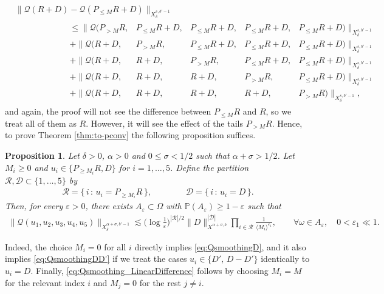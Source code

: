 \documentclass[11pt, xcolor = dvipsnames,reqno
]{amsart}
\newtheorem{prop}[thm]{Proposition}
\theoremstyle{definition}
\theoremstyle{remark}
\begin{document}
\begin{align}\label{eq:diff-ineqs}
    & \| \mathcal{Q}(R + D) - \mathcal{Q}(P_{\leq M} R + D) \|_{X^{s,b'-1}_{\delta}}  \\
    & \qquad \qquad \qquad \begin{array}{rrrrrrrr}
        \leq \big\| \mathcal{Q}( P_{> M} R,  & P_{\leq M} R + D, & P_{\leq M} R + D, & P_{\leq M} R + D, & P_{\leq M} R + D) \big\|_{X^{s,b'-1}_{\delta}}  \\
        + \big\| \mathcal{Q}( R + D, & P_{> M} R , & P_{\leq M} R + D, & P_{\leq M} R + D, & P_{\leq M} R + D) \big\|_{X^{s,b'-1}_{\delta}}  \\ 
        + \big\| \mathcal{Q}( R + D, & R + D, & P_{> M} R, & P_{\leq M} R + D, & P_{\leq M} R + D) \big\|_{X^{s,b'-1}_{\delta}}  \\ 
        + \big\| \mathcal{Q}( R + D, & R + D, & R + D, & P_{> M} R, & P_{\leq M} R + D) \big\|_{X^{s,b'-1}_{\delta}}  \\
        + \big\| \mathcal{Q}( R + D, & R + D, & R + D, & R + D, & P_{> M} R) \big\|_{X^{s,b'-1}_{\delta}},
    \end{array}
\end{align}
and again, the proof will not see the difference between $P_{\leq M} R$ and $R$, so we treat all of them as $R$. However, it will see the effect of the tails $P_{> M} R$.
Hence, to prove Theorem \ref{thm:to-pconv} the following proposition suffices. 

\begin{prop}\label{prop:Qsmoothing-simp}
    Let $\delta>0$, $\alpha > 0$ and  $0 \leq \sigma < 1/2$ such that $\alpha + \sigma > 1/2$.  Let $M_i \geq 0$ and $u_i \in \{P_{\geq M_i} R,D\}$ for $i = 1, \ldots, 5$. 
    Define the partition $\mathcal R, \mathcal{D} \subset \{1, \ldots, 5\}$ by
    \begin{align}\label{eq:R-D-sets}
        \mathcal R = \{\, i \, : \, u_i = P_{\geq M_i} R \, \}, 
        \qquad \qquad 
        \mathcal D = \{\, i \, : \, u_i = D \, \}.
    \end{align}
    Then, for every $\varepsilon > 0$, there exists $A_{\varepsilon} \subset \Omega$ with $\mathbb{P}(A_{\varepsilon}) \geq 1 - \varepsilon$ such that
    \begin{align}\label{eq:Qsmoothing-simp-1}
        \|\mathcal{Q}(u_1,u_2,u_3,u_4,u_5) \|_{X^{\alpha + \sigma, b'-1}_{\delta}} 
        \lesssim \Big(  \log \frac{1}{\varepsilon} \Big)^{|\mathcal{R}|/2} \|D\|_{X^{\alpha + \sigma,b}}^{|\mathcal{D}|} \prod_{i \in \mathcal{R}} \frac{1}{\langle M_i \rangle^{\varepsilon_1} }, 
        \qquad \forall \omega \in A_\varepsilon, \quad 0< \varepsilon_1 \ll 1.
    \end{align}
\end{prop}
Indeed, the choice $M_i = 0$ for all $i$ directly implies  \eqref{eq:QsmoothingD}, and it also implies \eqref{eq:QsmoothingDD'} if we treat the cases $u_i \in \{D', \, D - D' \}$ identically to $u_i = D$. 
Finally, \eqref{eq:Qsmoothing_LinearDifference} follows by choosing $M_i = M$ for the relevant index $i$ and $M_j = 0$ for the rest $j \neq i$. 
\end{document}
